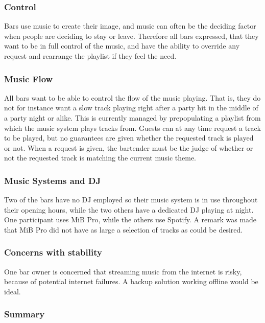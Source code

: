 \subsubsection{Control}
\label{sub:Control}
Bars use music to create their image, and music can often be the deciding factor when people are deciding to stay or leave. Therefore all bars expressed, that they want to be in full control of the music, and have the ability to override any request and rearrange the playlist if they feel the need.

\subsubsection{Music Flow}
\label{sub:MusicFlow}

All bars want to be able to control the flow of the music playing. That is, they do not for instance want a slow track playing right after a party hit in the middle of a party night or alike. This is currently managed by prepopulating a playlist from which the music system plays tracks from. Guests can at any time request a track to be played, but no guarantees are given whether the requested track is played or not. When a request is given, the bartender must be the judge of whether or not the requested track is matching the current music theme.

\subsubsection{Music Systems and DJ}
\label{sub:differences}
Two of the bars have no DJ employed so their music system is in use throughout their opening hours, while the two others have a dedicated DJ playing at night. One participant uses MiB Pro, while the others use Spotify. A remark was made that MiB Pro did not have as large a selection of tracks as could be desired.

\subsubsection{Concerns with stability}
\label{sub:specific_remarks}

One bar owner is concerned that streaming music from the internet is risky, because of potential internet failures. A backup solution working offline would be ideal.

\subsubsection{Summary}
\label{sub:summary}

